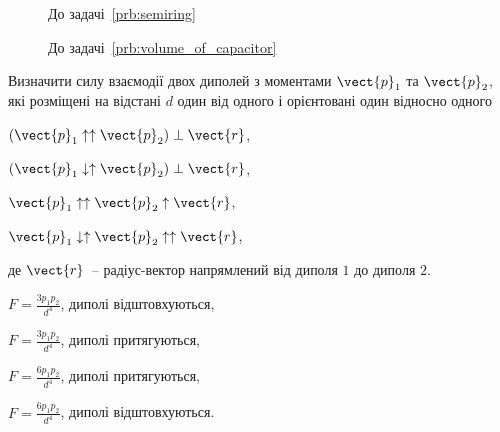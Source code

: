 \begin{figure}[h!]\centering
	\begin{minipage}[t]{0.45\linewidth}\centering
		\caption{До задачі~\ref{prb:semiring}}
		\label{semiring}
	\end{minipage}
	\begin{minipage}[t]{0.45\linewidth}\centering
		\caption{До задачі~\ref{prb:volume_of_capacitor}}
		\label{volume_of_capacitor}
	\end{minipage}
\end{figure}

\begin{problem}\label{dipole-dipole}
Визначити силу взаємодії двох диполей з моментами $\vect{p}_1$ та $\vect{p}_2$, які розміщені на відстані $d$ один від одного і орієнтовані один відносно одного
\begin{enumerate*}[label=\alph*)]
	\item $(\vect{p}_1 \uparrow \uparrow \vect{p}_2) \perp \vect{r}$,
	\item $(\vect{p}_1 \downarrow \uparrow \vect{p}_2) \perp \vect{r}$,
	\item $\vect{p}_1 \uparrow \uparrow \vect{p}_2 \uparrow \vect{r}$,
	\item $\vect{p}_1 \downarrow \uparrow \vect{p}_2 \uparrow \uparrow \vect{r}$,
\end{enumerate*}
де $\vect{r}$~-- радіус-вектор напрямлений від диполя $1$ до диполя $2$.
\begin{solution}
	\begin{enumerate*}[label=\alph*)]
		\item $F = \frac{3 p_1 p_2}{d^4}$, диполі відштовхуються,
		\item $F = \frac{3 p_1 p_2}{d^4}$, диполі притягуються,
		\item $F = \frac{6 p_1 p_2}{d^4}$, диполі притягуються,
		\item $F = \frac{6 p_1 p_2}{d^4}$, диполі відштовхуються.
	\end{enumerate*}
\end{solution}
\end{problem}

